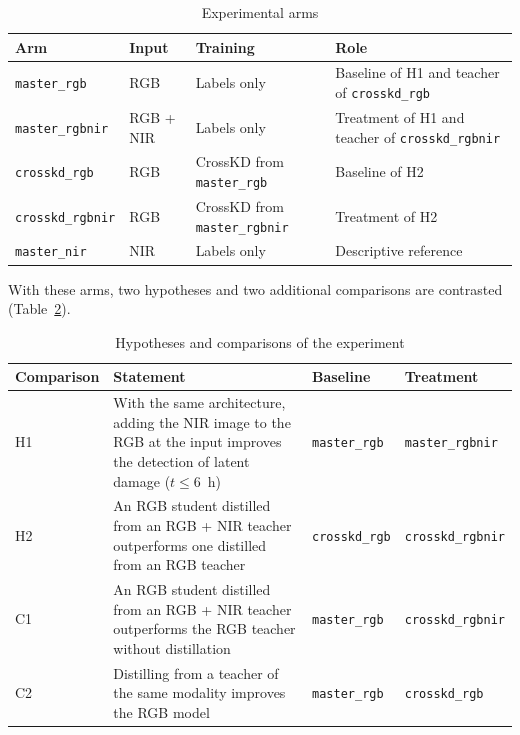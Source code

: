 \documentclass[journal]{IEEEtran}
\begin{document}
\begin{table}[!t]
\caption{Experimental arms}
\label{tab:arms}
\centering
\scriptsize
\setlength{\tabcolsep}{3pt}
\renewcommand{\arraystretch}{1.1}
\begin{tabular}{@{}p{1.8cm}p{1.0cm}p{1.9cm}p{3.1cm}@{}}
\toprule
Arm & Input & Training & Role \\
\midrule
\texttt{master\_\allowbreak rgb} & RGB & Labels only & Baseline of H1 and teacher of \texttt{crosskd\_\allowbreak rgb} \\
\texttt{master\_\allowbreak rgbnir} & RGB + NIR & Labels only & Treatment of H1 and teacher of \texttt{crosskd\_\allowbreak rgbnir} \\
\texttt{crosskd\_\allowbreak rgb} & RGB & CrossKD from \texttt{master\_\allowbreak rgb} & Baseline of H2 \\
\texttt{crosskd\_\allowbreak rgbnir} & RGB & CrossKD from \texttt{master\_\allowbreak rgbnir} & Treatment of H2 \\
\texttt{master\_\allowbreak nir} & NIR & Labels only & Descriptive reference \\
\bottomrule
\end{tabular}
\end{table}

With these arms, two hypotheses and two additional comparisons are contrasted (Table~\ref{tab:hyp}).

\begin{table}[!t]
\caption{Hypotheses and comparisons of the experiment}
\label{tab:hyp}
\centering
\footnotesize
\renewcommand{\arraystretch}{1.1}
\begin{tabular}{@{}lp{10cm}ll@{}}
\toprule
Comparison & Statement & Baseline & Treatment \\
\midrule
H1 & With the same architecture, adding the NIR image to the RGB at the input improves the detection of latent damage ($t \le 6$~h) & \texttt{master\_\allowbreak rgb} & \texttt{master\_\allowbreak rgbnir} \\
H2 & An RGB student distilled from an RGB + NIR teacher outperforms one distilled from an RGB teacher & \texttt{crosskd\_\allowbreak rgb} & \texttt{crosskd\_\allowbreak rgbnir} \\
C1 & An RGB student distilled from an RGB + NIR teacher outperforms the RGB teacher without distillation & \texttt{master\_\allowbreak rgb} & \texttt{crosskd\_\allowbreak rgbnir} \\
C2 & Distilling from a teacher of the same modality improves the RGB model & \texttt{master\_\allowbreak rgb} & \texttt{crosskd\_\allowbreak rgb} \\
\bottomrule
\end{tabular}
\end{table}
\end{document}
